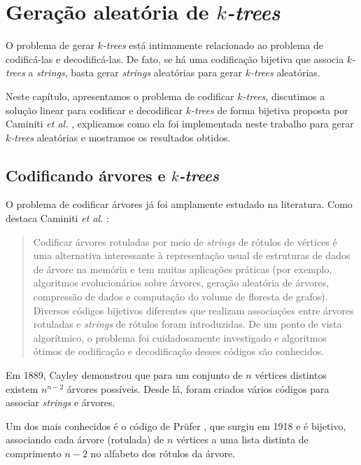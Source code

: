 \chapter{Geração aleatória de \emph{$k$-trees}}
\label{cap:geracao}

O problema de gerar \emph{$k$-trees} está intimamente relacionado ao problema de codificá-las e decodificá-las. De fato, se há uma codificação bijetiva que associa \emph{$k$-trees} a \emph{strings}, basta gerar \emph{strings} aleatórias para gerar \emph{$k$-trees} aleatórias.

Neste capítulo, apresentamos o problema de codificar \emph{$k$-trees}, discutimos a solução linear para codificar e decodificar \emph{$k$-trees} de forma bijetiva proposta por Caminiti \emph{et al.} \cite{caminiti}, explicamos como ela foi implementada neste trabalho para gerar \emph{$k$-trees} aleatórias e mostramos os resultados obtidos.

\section{Codificando árvores e \emph{$k$-trees}}

O problema de codificar árvores já foi amplamente estudado na literatura. Como destaca Caminiti \emph{et al.} \cite{caminiti}:

\begin{quotation}
  Codificar árvores rotuladas por meio de \emph{strings} de rótulos de vértices é uma alternativa interessante à representação usual de estruturas de dados de árvore na memória e tem muitas aplicações práticas (por exemplo, algoritmos evolucionários sobre árvores, geração aleatória de árvores, compressão de dados e computação do volume de floresta de grafos). Diversos códigos bijetivos diferentes que realizam associações entre árvores rotuladas e \emph{strings} de rótulos foram introduzidas. De um ponto de vista algorítmico, o problema foi cuidadosamente investigado e algoritmos ótimos de codificação e decodificação desses códigos são conhecidos.
\end{quotation}

Em 1889, Cayley \cite{cayley} demonstrou que para um conjunto de $n$ vértices distintos existem $n^{n-2}$ árvores possíveis. Desde lá, foram criados vários códigos para associar \emph{strings} e árvores.

Um dos mais conhecidos é o código de Prüfer \cite{prufer}, que surgiu em 1918 e é bijetivo, associando cada árvore (rotulada) de $n$ vértices a uma lista distinta de comprimento $n-2$ no alfabeto dos rótulos da árvore.

